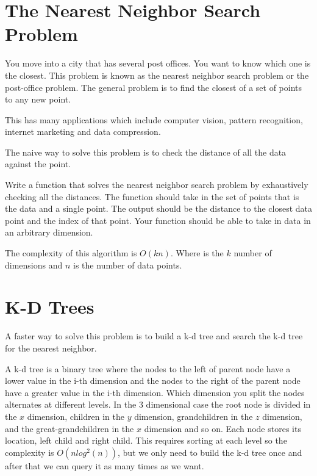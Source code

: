 \label{Ch:NNS}


\section*{The Nearest Neighbor Search Problem}

You move into a city that has several post offices.
You want to know which one is the closest.
This problem is  known as the nearest neighbor search problem or the post-office problem.
The general problem is to find the closest of a set of points to any new point.

This has many applications which include computer vision, pattern recognition, internet marketing and data compression.

The naive way to solve this problem is to check the distance of all the data against the point.

\begin{problem}
Write a function that solves the nearest neighbor search problem by exhaustively checking all the distances.
The function should take in the set of points that is the data and a single point.
The output should be the distance to the closest data point and the index of that point.
Your function should be able to take in data in an arbitrary dimension.
\end{problem}

The complexity of this algorithm is $O(kn)$.
Where  is the $k$ number of dimensions and $n$ is the number of data points.

\section*{K-D Trees}

A faster way to solve this problem is to build a k-d tree and search the k-d tree for the nearest neighbor. 

A k-d tree is a binary tree where the nodes to the left of parent node have a lower value in the i-th dimension and the nodes to the right of the parent node have a greater value in the i-th dimension.
Which dimension you split the nodes alternates at different levels.
In the $3$ dimensional case the root node is divided in the $x$ dimension, children in the $y$ dimension, grandchildren in the $z$ dimension, and the great-grandchildren in the $x$ dimension and so on.
Each node stores its location, left child and right child.
This requires sorting at each level so the complexity is $O(n log^2(n))$, but we only need to build the k-d tree once and after that we can query it as many times as we want.

